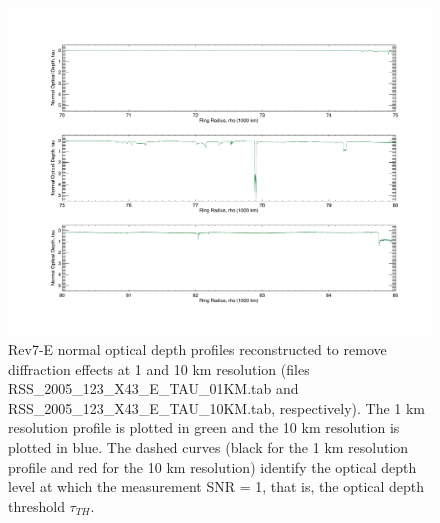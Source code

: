 \documentclass[crop=false,class=book]{standalone}
\begin{document}
\begin{figure}[H]
    \centering
    \includegraphics[page=1,width=\textwidth,trim = {1.1in 0.85in 0.8in 0.0in},clip]{Rev007_E_X43_summary_p2_08FEB2018.pdf}
    \caption[Normal Optical Depth Profiles from the Easy Data]{Rev7-E normal optical depth profiles reconstructed to remove diffraction effects at 1 and 10 km resolution (files RSS\_2005\_123\_X43\_E\_TAU\_01KM.tab and RSS\_2005\_123\_X43\_E\_TAU\_10KM.tab, respectively). The 1 km resolution profile is plotted in green and the 10 km resolution is plotted in blue. The dashed curves (black for the 1 km resolution profile and red for the 10 km resolution) identify the optical depth level at which the measurement SNR = 1, that is, the optical depth threshold $\tau_{TH}$.}
\end{figure}
\end{document}
